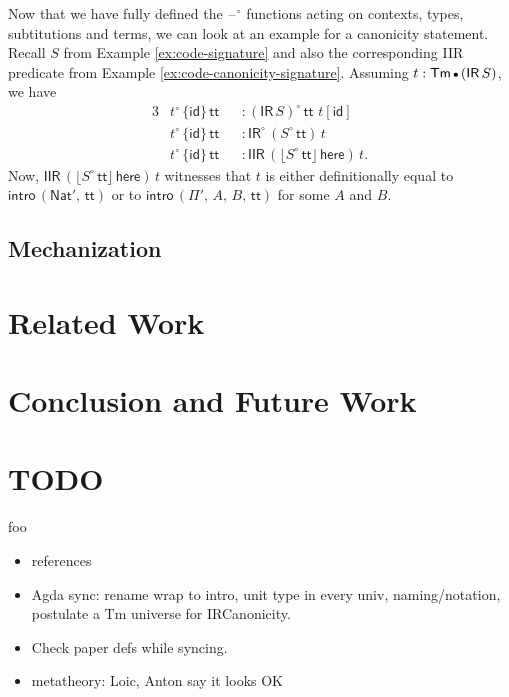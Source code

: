 \documentclass[acmsmall,screen,review,anonymous]{acmart}
\newcommand{\msf}[1]{{\mathsf{#1}}}
\newcommand{\Nat}{\msf{Nat}}
\newcommand{\ttt}{\msf{tt}}
\newcommand{\blank}{{\mathord{\hspace{1pt}\text{--}\hspace{1pt}}}}
\newcommand{\IR}{\msf{IR}}
\newcommand{\intro}{\msf{intro}}
\newcommand{\IIR}{\msf{IIR}}
\newcommand{\floord}[1]{\lfloor #1 \rfloor}
\newcommand{\emptycon}{\scaleobj{.75}\bullet}
\newcommand{\id}{\msf{id}}
\newcommand{\Tm}{\msf{Tm}}
\newcommand{\w}{\circ}
\newcommand{\here}{\msf{here}}
\begin{document}
\begin{example}
Now that we have fully defined the $\blank^\w$ functions acting on contexts, types, subtitutions and
terms, we can look at an example for a canonicity statement. Recall $S$ from Example \ref{ex:code-signature} and
also the corresponding IIR predicate from Example \ref{ex:code-canonicity-signature}. Assuming $t :
\Tm\,\emptycon\,(\IR\,S)$, we have
\begin{alignat*}{3}
  &t^\w\,\{\id\}\,\ttt &&: (\IR\,S)^\w\,\ttt\,\,t[\id]\\
  &t^\w\,\{\id\}\,\ttt &&: \IR^\w\,(S^\w\,\ttt)\,t\\
  &t^\w\,\{\id\}\,\ttt &&: \IIR\,(\floord{S^\w\,\ttt}\,\here)\,t.
\end{alignat*}
Now, $\IIR\,(\floord{S^\w\,\ttt}\,\here)\,t$ witnesses that $t$ is either definitionally equal to $\intro\,(\Nat',\,\ttt)$
or to $\intro\,(\Pi',\,A,\,B,\,\ttt)$ for some $A$ and $B$.
\end{example}

\subsection{Mechanization}

\section{Related Work}

\section{Conclusion and Future Work}


\section{TODO}

foo


\begin{itemize}
  \item references
  \item Agda sync: rename wrap to intro, unit type in every univ, naming/notation, postulate a Tm universe for IRCanonicity.
  \item Check paper defs while syncing.
  \item metatheory: Loic, Anton say it looks OK
\end{itemize}



\end{document}
